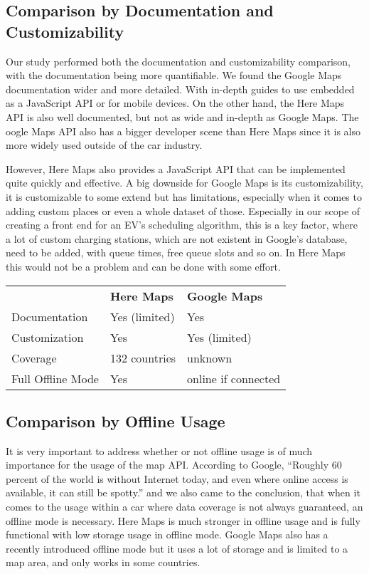 \subsection{Comparison by Documentation and Customizability}

Our study performed both the documentation and customizability comparison, with the documentation being more quantifiable. We found the Google Maps documentation wider and more detailed. With in-depth guides to use embedded as a JavaScript API or for mobile devices. On the other hand, the Here Maps API is also well documented, but not as wide and in-depth as Google Maps. The oogle Maps API also has a bigger developer scene than Here Maps since it is also more widely used outside of the car industry.

However, Here Maps also provides a JavaScript API that can be implemented quite quickly and effective. A big downside for Google Maps is its customizability, it is customizable to some extend but has limitations, especially when it comes to adding custom places or even a whole dataset of those. Especially in our scope of creating a front end for an EV's scheduling algorithm, this is a key factor, where a lot of custom charging stations, which are not existent in Google's database, need to be added, with queue times, free queue slots and so on. In Here Maps this would not be a problem and can be done with some effort. 


\begin{table}[htp]
\renewcommand{\arraystretch}{1.5}
\begin{tabular}{lll}
 & \textbf{Here Maps} & \textbf{Google Maps} \\
Documentation & Yes (limited) & Yes \\
Customization & Yes & Yes (limited) \\
Coverage & 132 countries & unknown \\
Full Offline Mode & Yes & online if connected
\end{tabular}
\end{table}


\subsection{Comparison by Offline Usage}

It is very important to address whether or not offline usage is of much importance for the usage of the map API. According to Google, ``Roughly 60 percent of the world is without Internet today, and even where online access is available, it can still be spotty.'' \cite{driver-9} and we also came to the conclusion, that when it comes to the usage within a car where data coverage is not always guaranteed, an offline mode is necessary. Here Maps is much stronger in offline usage and is fully functional with low storage usage in offline mode. Google Maps also has a recently introduced offline mode but it uses a lot of storage and is limited to a map area, and only works in some countries. 


